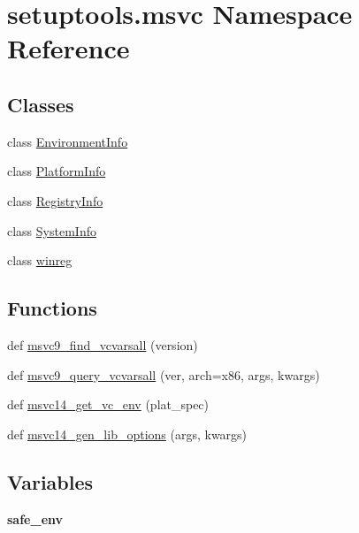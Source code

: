 \hypertarget{namespacesetuptools_1_1msvc}{}\section{setuptools.\+msvc Namespace Reference}
\label{namespacesetuptools_1_1msvc}
\subsection*{Classes}
\begin{DoxyCompactItemize}
\item 
class \hyperlink{classsetuptools_1_1msvc_1_1_environment_info}{Environment\+Info}
\item 
class \hyperlink{classsetuptools_1_1msvc_1_1_platform_info}{Platform\+Info}
\item 
class \hyperlink{classsetuptools_1_1msvc_1_1_registry_info}{Registry\+Info}
\item 
class \hyperlink{classsetuptools_1_1msvc_1_1_system_info}{System\+Info}
\item 
class \hyperlink{classsetuptools_1_1msvc_1_1winreg}{winreg}
\end{DoxyCompactItemize}
\subsection*{Functions}
\begin{DoxyCompactItemize}
\item 
def \hyperlink{namespacesetuptools_1_1msvc_a4ee903451bc75bf16dbdd14461ed230f}{msvc9\+\_\+find\+\_\+vcvarsall} (version)
\item 
def \hyperlink{namespacesetuptools_1_1msvc_afdbaf4f7d94d7e19c621a4632d9a8027}{msvc9\+\_\+query\+\_\+vcvarsall} (ver, arch=\textquotesingle{}x86\textquotesingle{}, args, kwargs)
\item 
def \hyperlink{namespacesetuptools_1_1msvc_abf4312c4a50e38b0965b836584cf402c}{msvc14\+\_\+get\+\_\+vc\+\_\+env} (plat\+\_\+spec)
\item 
def \hyperlink{namespacesetuptools_1_1msvc_aa2d697d927b0bed28a47be76cea5a729}{msvc14\+\_\+gen\+\_\+lib\+\_\+options} (args, kwargs)
\end{DoxyCompactItemize}
\subsection*{Variables}
\begin{DoxyCompactItemize}
\item 
\mbox{\label{namespacesetuptools_1_1msvc_ac539bcfcdbc99c49e78edc78e6b4c9d5}} 
{\bfseries safe\+\_\+env}
\end{DoxyCompactItemize}


